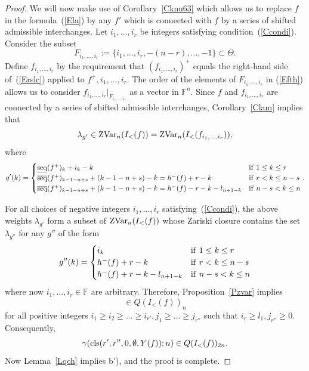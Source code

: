 \documentclass[10pt]{amsart}\oddsidemargin -1mm \evensidemargin -1mm \topmargin -15mm\headheight5mm \headsep 3.5mm \textheight 245mm\textwidth 170mm
\theoremstyle{definition}\newtheorem{theorem}{Theorem}[section]\newtheorem{lemma}[theorem]{Lemma}\newtheorem{remark}[theorem]{Remark}\newtheorem{proposition}[theorem]{Proposition}\newtheorem{corollary}[theorem]{Corollary}\newtheorem{definition}[theorem]{Definition}\newtheorem{Ex}[theorem]{Example}\newtheorem{obs}[theorem]{Observation}\newtheorem{nota}[theorem]{Notation}
\begin{document}
\begin{proof}
We will now make use of Corollary~\ref{Cknu63} which allows us to replace $f$ in the formula~(\ref{Ela}) by any $f'$ which is connected with $f$ by a series of shifted admissible interchanges. 
Let $i_1,..., i_r$ be integers satisfying condition~(\ref{Ccondi}). 
Consider the subset \begin{equation}F_{i_1,..., i_r}:=\{i_1,..., i_r,-(n-r),..., -1\}\subset \Theta.\label{Efth}\end{equation} 
Define $f_{i_1,..., i_r}$ by the requirement that $(f_{i_1,..., i_r})^+$ equals the right-hand side of~(\ref{Erslc}) applied to $f^+, i_1,..., i_r$. 
The order of the elements of $F_{i_1,..., i_r}$ in (\ref{Efth}) allows us to consider $f_{i_1,..., i_r}|_{F_{i_1,..., i_r}}$ as a vector in $\mathbb F^n$. 
Since $f$ and $f_{i_1,..., i_r}$ are connected by a series of shifted admissible interchanges, Corollary~\ref{Clam} implies that
$$\lambda_{g'}\in {\rm ZVar}_n(I_<(f))={\rm ZVar}_n(I_<(f_{i_1,..., i_r})),$$where
$$g'(k)=\begin{cases}{\rm\underline{seq}}(f^+)_k+i_k-k&{\rm if~}1\le k\le r\\
{\rm\overline{seq}}(f^+)_{k-1-n+s}+(k-1-n+s)-k=h^-(f)+r-k&{\rm if~}r<k\le n-s\\
{\rm\overline{seq}}(f^+)_{k-1-n+s}+(k-1-n+s)-k=h^-(f)-r-k-l_{n+1-k}&{\rm if~}n-s<k\le n\\
\end{cases}.$$ 

For all choices of negative integers $i_1,..., i_r$ satisfying~(\ref{Ccondi}), the above weights $\lambda_{g'}$ form a subset of ${\rm ZVar}_n(I_<(f))$ whose Zariski closure contains the set $\lambda_{g''}$ for any $g''$ of the form
$$g''(k)=\begin{cases} i_k&{\rm if~}1\le k\le r\\
h^-(f)+r-k&{\rm if~}r<k\le n-s\\
h^-(f)+r-k-l_{n+1-k}&{\rm if~}n-s<k\le n\\
\end{cases}$$
where now $i_1,..., i_r\in\mathbb F$ are arbitrary. 
Therefore, Proposition~\ref{Pzvar} implies
\begin{equation}[L(i_1,..., i_{r'}, l_1, l_2,..., l_s, 0,..., 0, -j_{r''}, ..., -j_2, -j_1)]\in Q(I_<(f))_n\label{Eij}\end{equation}
for all positive integers $i_1\ge i_2\ge...\ge i_{r'}, j_1\ge...\ge j_{r''}$ such that $i_r\ge l_1, j_{r''}\ge0$. 
Consequently, \begin{equation}\gamma({\rm cls}(r', r'', 0, \emptyset, {Y}(f)); n)\in Q(I_<(f))_{2n}.\label{Est3}\end{equation}
Now Lemma~\ref{Lqch} implies b$'$), and the proof is complete.\end{proof}
\end{document}

